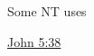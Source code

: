 				
				\begin{compactdesc}
					\item[Some NT uses] \textbf{}
						\begin{compactdesc}
							\item[{\hyperref[JOHN-5-38]{John 5:38}}]
						\end{compactdesc}
				\end{compactdesc}
		
	
		
		
	
		
		
	
		
		
